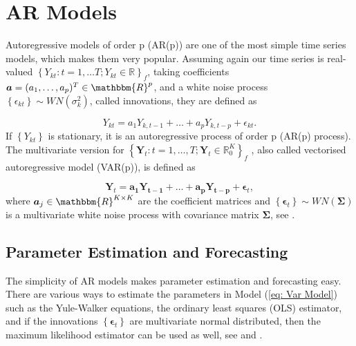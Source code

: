 \section{AR Models}
\label{sec: Ar Models}

Autoregressive models of order p (AR(p)) are one of the most simple time series models, which makes them very popular. Assuming again our time series is real-valued $\left\{Y_{kt}:t=1,\ldots T; Y_{kt} \in \mathbb{R}\right\}_f$, taking coefficients $\bm{a}=(a_1,\ldots,a_p)^T \in \mathbbm{R}^p$, and a white noise process $\left\{\epsilon_{kt}\right\} \sim WN(\sigma_k^2)$, called innovations, they are defined as 

\begin{equation}
Y_{kt} = a_1Y_{k,t-1} + \ldots + a_p Y_{k,t-p} + \epsilon_{kt}.
\label{eq: Ar model}
\end{equation}
%
If $\left\{ Y_{kt} \right\}$ is stationary, it is an autoregressive process of order p (AR(p) process). The multivariate version for  $\left\{\bm{Y}_t:t=1,\ldots,T; \bm{Y}_t \in \mathbb{R}_0^K \right\}_f$ , also called vectorised autoregressive model (VAR(p)), is defined as 

\begin{equation}
\bm{Y}_{t} = \bm{a_1 Y_{t-1}}+ \ldots + \bm{a_p Y_{t-p}} + \bm{\epsilon}_{t},
\label{eq: Var Model}
\end{equation}
%
where $\bm{a}_j \in \mathbbm{R}^{K \times K}$ are the coefficient matrices and $\left\{\bm{\epsilon}_t \right\}\sim WN(\bm{\Sigma})$ is a multivariate white noise process with covariance matrix $\bm{\Sigma}$, see \textcite{Scherrer:2021}. %

\subsection{Parameter Estimation and Forecasting}
\label{sec: AR Estimation and Forecasting}

The simplicity of AR models makes parameter estimation and forecasting easy. There are various ways to estimate the parameters in Model (\ref{eq: Var Model}) such as the Yule-Walker equations, the ordinary least squares (OLS) estimator, and if the innovations $\left\{\bm{\epsilon}_t\right\}$ are multivariate normal distributed, then the maximum likelihood estimator can be used as well, see \textcite{Scherrer:2021} and \textcite{Hamilton:1994}. %

